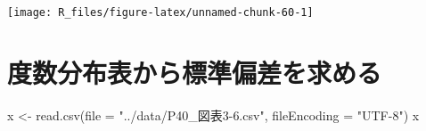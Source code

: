 \documentclass[
  12pt,
]{book}
\newenvironment{Shaded}{\begin{snugshade}}{\end{snugshade}}
\newcommand{\AttributeTok}[1]{\textcolor[rgb]{0.77,0.63,0.00}{#1}}
\newcommand{\CommentTok}[1]{\textcolor[rgb]{0.56,0.35,0.01}{\textit{#1}}}
\newcommand{\DecValTok}[1]{\textcolor[rgb]{0.00,0.00,0.81}{#1}}
\newcommand{\FloatTok}[1]{\textcolor[rgb]{0.00,0.00,0.81}{#1}}
\newcommand{\FunctionTok}[1]{\textcolor[rgb]{0.00,0.00,0.00}{#1}}
\newcommand{\NormalTok}[1]{#1}
\newcommand{\OtherTok}[1]{\textcolor[rgb]{0.56,0.35,0.01}{#1}}
\newcommand{\SpecialCharTok}[1]{\textcolor[rgb]{0.00,0.00,0.00}{#1}}
\newcommand{\StringTok}[1]{\textcolor[rgb]{0.31,0.60,0.02}{#1}}
\begin{document}
\begin{Shaded}
\end{Shaded}

\begin{center}\texttt{[image: R\_files/figure-latex/unnamed-chunk-60-1]} \end{center}

\hypertarget{ux5ea6ux6570ux5206ux5e03ux8868ux304bux3089ux6a19ux6e96ux504fux5deeux3092ux6c42ux3081ux308b}{%
\section{度数分布表から標準偏差を求める}\label{ux5ea6ux6570ux5206ux5e03ux8868ux304bux3089ux6a19ux6e96ux504fux5deeux3092ux6c42ux3081ux308b}}

\begin{Shaded}
\begin{Highlighting}[]
\NormalTok{x }\OtherTok{\textless{}{-}} \FunctionTok{read.csv}\NormalTok{(}\AttributeTok{file =} \StringTok{"../data/P40\_図表3{-}6.csv"}\NormalTok{, }\AttributeTok{fileEncoding =} \StringTok{"UTF{-}8"}\NormalTok{)}
\NormalTok{x}
\end{Highlighting}
\end{Shaded}
\end{document}
